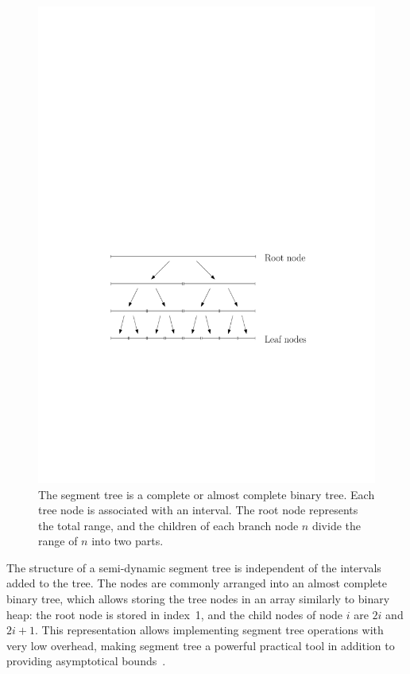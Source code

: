 \documentclass[english,gradu]{tktltiki2018}
\begin{document}
\begin{figure}\centering
	\includegraphics[scale=0.7,page=1]{fig/segtree}
	\caption{The segment tree is a complete or almost complete binary tree.
	Each tree node is associated with an interval.
	The root node represents the total range, and the children of each branch node $n$ divide the range of $n$ into two parts.}\label{fig:segtree}
\end{figure}

The structure of a semi-dynamic segment tree is independent of the intervals added to the tree.
The nodes are commonly arranged into an almost complete binary tree, which allows storing the tree nodes in an array similarly to binary heap:
the root node is stored in index~1, and the child nodes of node $i$ are $2i$ and $2i+1$.
This representation allows implementing segment tree operations with very low overhead, making segment tree a powerful practical tool in addition to providing asymptotical bounds~\cite{kkkk}.
\end{document}
